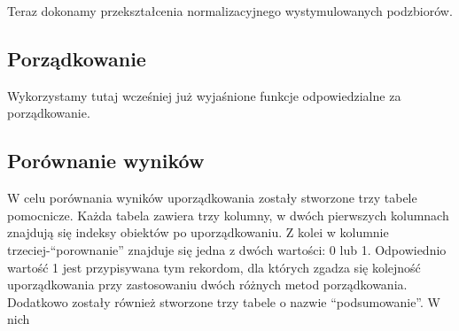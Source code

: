 \documentclass[12pt,a4paper]{report}
\begin{document}
{\begin{Shaded}
\begin{Highlighting}[]
\NormalTok{)}
\NormalTok{)}
\NormalTok{)}
\end{Highlighting}
\end{Shaded}

Teraz dokonamy przekształcenia normalizacyjnego wystymulowanych
podzbiorów.

\begin{Shaded}
\begin{Highlighting}[]
\end{Highlighting}
\end{Shaded}

\subsection{Porządkowanie}
Wykorzystamy tutaj wcześniej już wyjaśnione funkcje odpowiedzialne za porządkowanie. 

\begin{Shaded}
\begin{Highlighting}[]
\end{Highlighting}
\end{Shaded}

\subsection{Porównanie wyników}
W celu porównania wyników uporządkowania zostały stworzone trzy tabele
pomocnicze. Każda tabela zawiera trzy kolumny, w dwóch pierwszych
kolumnach znajdują się indeksy obiektów po uporządkowaniu. Z kolei w
kolumnie trzeciej-``porownanie'' znajduje się jedna z dwóch wartości: 0
lub 1. Odpowiednio wartość 1 jest przypisywana tym rekordom, dla których
zgadza się kolejność uporządkowania przy zastosowaniu dwóch różnych
metod porządkowania. Dodatkowo zostały również stworzone trzy tabele o
nazwie ``podsumowanie''. W nich

}
\end{document}
